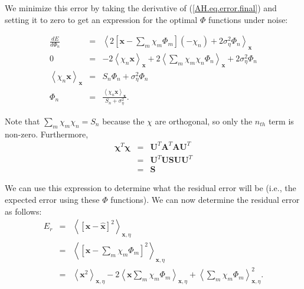 \documentclass[10pt,letterpaper,oneside]{article}
\begin{document}
We minimize this error by taking the derivative of (\ref{AH.eq.error.final})
and setting it to zero to get an expression for the optimal $\Phi$
functions under noise: 

\begin{eqnarray}
\frac{dE}{d\Phi_{n}} & = & \left\langle 2\left[\mathbf{x}-\sum_{m}\chi_{m}\Phi_{m}\right](-\chi_{n})+2\sigma_{\eta}^{2}\Phi_{n}\right\rangle _{\mathbf{x}}\nonumber \\
0 & = & -2\left\langle \chi_{n}\mathbf{x}\right\rangle _{\mathbf{x}}+2\left\langle \sum_{m}\chi_{m}\chi_{n}\Phi_{n}\right\rangle _{\mathbf{x}}+2\sigma_{\eta}^{2}\Phi_{n}\nonumber \\
\left\langle \chi_{n}\mathbf{x}\right\rangle _{\mathbf{x}} & = & S_{n}\Phi_{n}+\sigma_{\eta}^{2}\Phi_{n}\nonumber \\
\Phi_{n} & = & \frac{\left\langle \chi_{n}\mathbf{x}\right\rangle _{\mathbf{x}}}{S_{n}+\sigma_{\eta}^{2}}.\label{AH.eq.Phi2}
\end{eqnarray}

Note that $\sum_m \chi_m \chi_n = S_n$ because the $\chi$ are orthogonal, so only the $n_{th}$ term is non-zero. Furthermore, 
\begin{eqnarray*}
  \mathbf{\chi}^T \mathbf{\chi} &=& \mathbf{U}^T \mathbf{A}^T \mathbf{A} \mathbf{U}^T \\
  &=& \mathbf{U}^T \mathbf{U} \mathbf{S} \mathbf{U} \mathbf{U}^T \\
  &=& \mathbf{S}
\end{eqnarray*}

We can use this expression to determine what the residual error will
be (i.e., the expected error using these $\Phi$ functions). We can now determine the residual error as follows:
\begin{eqnarray*}
E_{r} & = & \left\langle \left[\mathbf{x}-\hat{\mathbf{x}}\right]^{2}\right\rangle _{\mathbf{x},\eta}\\
 & = & \left\langle \left[\mathbf{x}-\sum_{m}\chi_{m}\Phi_{m}\right]^{2}\right\rangle _{\mathbf{x},\eta}\\
 & = & \left\langle \mathbf{x}^{2}\right\rangle _{\mathbf{x},\eta}-2\left\langle \mathbf{x}\sum_{m}\chi_{m}\Phi_{m}\right\rangle _{\mathbf{x},\eta}+\left\langle \sum_{m}\chi_{m}\Phi_{m}\right\rangle _{\mathbf{x},\eta}^{2}.
\end{eqnarray*}
\end{document}
